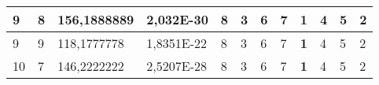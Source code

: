 \documentclass[conference]{IEEEtran}
\begin{document}
\begin{table*}[]
\begin{tabular}{|llll|llllllll|}
\multicolumn{1}{|l|}{9}                                                              & \multicolumn{1}{l|}{8}                                                                 & \multicolumn{1}{l|}{156,1888889}                                                           & 2,032E-30                               & \multicolumn{1}{l|}{8}                                                           & \multicolumn{1}{l|}{3}                                                           & \multicolumn{1}{l|}{6}                                                           & \multicolumn{1}{l|}{7}                                                           & \multicolumn{1}{l|}{\textbf{1}}                                                  & \multicolumn{1}{l|}{4}                                                           & \multicolumn{1}{l|}{5}                                                           & 2                                   \\ \hline
\multicolumn{1}{|l|}{9}                                                              & \multicolumn{1}{l|}{9}                                                                 & \multicolumn{1}{l|}{118,1777778}                                                           & 1,8351E-22                              & \multicolumn{1}{l|}{8}                                                           & \multicolumn{1}{l|}{3}                                                           & \multicolumn{1}{l|}{6}                                                           & \multicolumn{1}{l|}{7}                                                           & \multicolumn{1}{l|}{\textbf{1}}                                                  & \multicolumn{1}{l|}{4}                                                           & \multicolumn{1}{l|}{5}                                                           & 2                                   \\ \hline
\multicolumn{1}{|l|}{10}                                                             & \multicolumn{1}{l|}{7}                                                                 & \multicolumn{1}{l|}{146,2222222}                                                           & 2,5207E-28                              & \multicolumn{1}{l|}{8}                                                           & \multicolumn{1}{l|}{3}                                                           & \multicolumn{1}{l|}{6}                                                           & \multicolumn{1}{l|}{7}                                                           & \multicolumn{1}{l|}{\textbf{1}}                                                  & \multicolumn{1}{l|}{4}                                                           & \multicolumn{1}{l|}{5}                                                           & 2                                   \\ \hline

\end{tabular}
\end{table*}
\end{document}
